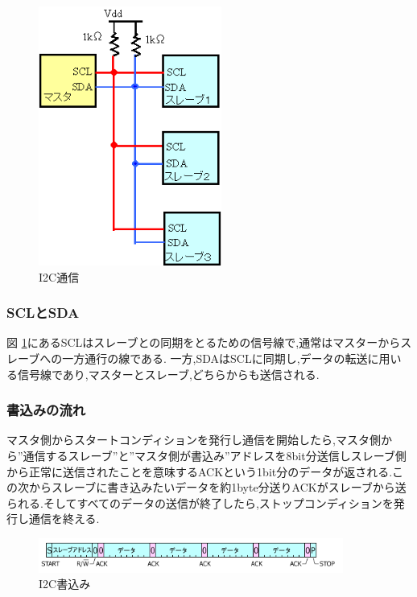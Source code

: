 \documentclass[12pt,oneside]{paper}
\begin{document}
\begin{figure}[H]
  \begin{center}
    \includegraphics[width=60mm]{ga/i2c.png}
    \end{center}
  \caption{I2C通信}
 \label{fig:i2c}
\end{figure}

\subsubsection{SCLとSDA}
図 \ref{fig:i2c}にあるSCLはスレーブとの同期をとるための信号線で,通常はマスターからスレーブへの一方通行の線である.
一方,SDAはSCLに同期し,データの転送に用いる信号線であり,マスターとスレーブ,どちらからも送信される.


\subsubsection{書込みの流れ}

マスタ側からスタートコンディションを発行し通信を開始したら,マスタ側から''通信するスレーブ''と''マスタ側が書込み''アドレスを8bit分送信しスレーブ側から正常に送信されたことを意味するACKという1bit分のデータが返される.この次からスレーブに書き込みたいデータを約1byte分送りACKがスレーブから送られる.そしてすべてのデータの送信が終了したら,ストップコンディションを発行し通信を終える.

\begin{figure}[htbp]
  \begin{center}
    \includegraphics[width=100mm]{ga/i2c_w.png}
    \end{center}
  \caption{I2C書込み}
 \label{fig:i2c_w}
\end{figure}
\end{document}
